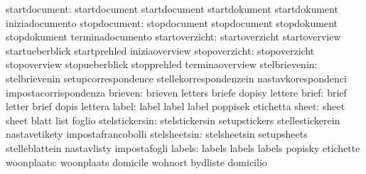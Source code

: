                    startdocument: startdocument                    startdocument
                                  startdokument                    startdokument
                                  iniziadocumento
                    stopdocument: stopdocument                     stopdocument
                                  stopdokument                     stopdokument
                                  terminadocumento
                  startoverzicht: startoverzicht                   startoverview
                                  startueberblick                  startprehled
                                  iniziaoverview                   %
                   stopoverzicht: stopoverzicht                    stopoverview
                                  stopueberblick                   stopprehled
                                  terminaoverview
                   stelbrievenin: stelbrievenin                    setupcorrespondence
                                  stellekorrespondenzein           nastavkorespondenci
                                  impostacorrispondenza
                         brieven: brieven                          letters
                                  briefe                           dopisy
                                  lettere
                           brief: brief                            letter
                                  brief                            dopis
                                  lettera
                           label: label                            label
                                  label                            poppisek
                                  etichetta
                           sheet: sheet                            sheet
                                  blatt                            list
                                  foglio
                  stelstickersin: stelstickersin                   setupstickers
                                  stellestickerein                 nastavetikety
                                  impostafrancobolli               %
                    stelsheetsin: stelsheetsin                     setupsheets
                                  stelleblattein                   nastavlisty
                                  impostafogli
                          labels: labels                           labels
                                  labels                           popisky
                                  etichette
                      woonplaats: woonplaats                       domicile
                                  wohnort                          bydliste
                                  domicilio

\stopcommands


\stoplogginginterface

\endinput
